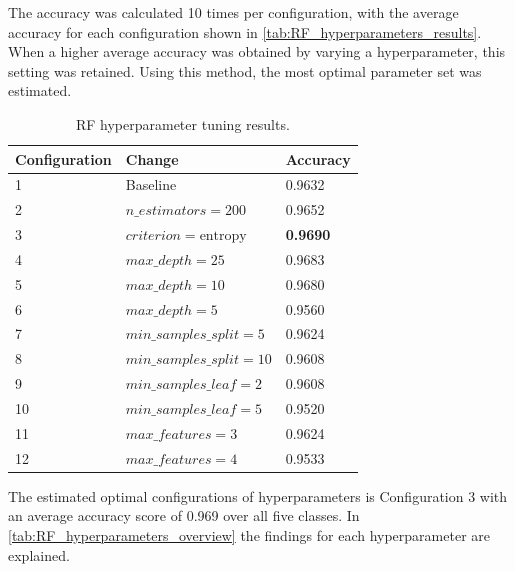 \documentclass[a4paper,11pt]{scrartcl}
\begin{document}
The accuracy was calculated 10 times per configuration, with the average accuracy for each configuration shown in \autoref{tab:RF_hyperparameters_results}. When a higher average accuracy was obtained by varying a hyperparameter, this setting was retained. Using this method, the most optimal parameter set was estimated. 
\begin{table}[h]
\centering
\begin{tabular}{lll}
\hline
Configuration & Change & Accuracy \\
\hline
1 & Baseline & 0.9632 \\
2 & $n\_estimators=200$ & 0.9652 \\
3 & $criterion=\text{entropy}$ & \textbf{0.9690} \\
4 & $max\_depth=25$ & 0.9683 \\
5 & $max\_depth=10$ & 0.9680 \\
6 & $max\_depth=5$ & 0.9560 \\
7 & $min\_samples\_split=5$ & 0.9624 \\
8 & $min\_samples\_split=10$ & 0.9608 \\
9 & $min\_samples\_leaf=2$ & 0.9608 \\
10 & $min\_samples\_leaf=5$ & 0.9520 \\
11 & $max\_features=3$ & 0.9624 \\
12 & $max\_features=4$ & 0.9533 \\
\hline
\end{tabular}
\caption{RF hyperparameter tuning results.}
\label{tab:RF_hyperparameters_results}
\end{table}


The estimated optimal configurations of hyperparameters is Configuration 3 with an average accuracy score of 0.969 over all five classes. In \autoref{tab:RF_hyperparameters_overview} the findings for each hyperparameter are explained.
\end{document}
